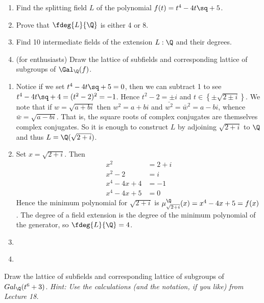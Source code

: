 \documentclass{article}
\begin{document}
\begin{exercise}
  \begin{enumerate}[label=(\alph*)]
    \item Find the splitting field \( L \) of the polynomial \( f(t) = t^4 - 4t\sq + 5 \).
    \item Prove that \( \fdeg{L}{\Q} \) is either 4 or 8.
    \item Find 10 intermediate fields of the extension \( L:\Q \) and their degrees.
    \item (for enthusiasts) Draw the lattice of subfields and corresponding lattice of subgroups of \( \Gal_\Q(f) \).
  \end{enumerate}
\end{exercise}
\begin{enumerate}[label=(\alph*)]
  \item \begin{solution}
    Notice if we set \( t^4 - 4t\sq + 5 = 0 \), then we can subtract 1 to see \( t^4 - 4t\sq + 4 = (t^2 - 2)^2 = -1 \).
    Hence \( t^2 - 2 = \pm i \) and \( t \in \left\{ \pm\sqrt{2\pm i} \right\} \).
    We note that if \( w = \sqrt{a+bi} \) then \( w^2 = a+bi \) and \( \bar{w^2} = \bar{w}^2 = a-bi \), whence \( \bar w = \sqrt{a-bi} \).
    That is, the square roots of complex conjugates are themselves complex conjugates.
    So it is enough to construct \( L \) by adjoining \( \sqrt{2+i} \) to \( \Q \) and thus \( L = \Q(\sqrt{2+i}) \).
  \end{solution}

  \item \begin{solution}
    Set \( x = \sqrt{2+i} \).
    Then \begin{align*}
      x^2 &= 2+i \\
      x^2 - 2 &= i \\
      x^4-4x+4 &= -1 \\
      x^4-4x+5 &= 0
    \end{align*}
    Hence the minimum polynomial for \( \sqrt{2+i} \) is \( \mu_{\sqrt{2+i}}^\Q(x) = x^4-4x+5 = f(x) \).
    The degree of a field extension is the degree of the minimum polynomial of the generator, so \( \fdeg{L}{\Q} = 4 \).
  \end{solution}
  \item \begin{solution}

  \end{solution}
  \item \begin{solution}

  \end{solution}
\end{enumerate}

\begin{exercise}
  Draw the lattice of subfields and corresponding lattice of subgroups of \( Gal_\Q(t^6 + 3) \). \it{Hint}: Use the calculations (and the notation, if you like) from Lecture 18.
\end{exercise}
\begin{solution}

\end{solution}
\end{document}
